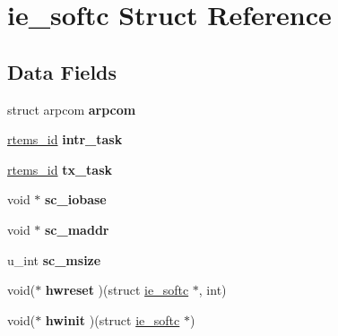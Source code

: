 \hypertarget{structie__softc}{}\section{ie\+\_\+softc Struct Reference}
\label{structie__softc}
\subsection*{Data Fields}
\begin{DoxyCompactItemize}
\item 
\mbox{\label{structie__softc_a9fa4f9da0ae481007ad149310d75d457}} 
struct arpcom {\bfseries arpcom}
\item 
\mbox{\label{structie__softc_abf9fa41076974007995b1df6c484bf7a}} 
\mbox{\hyperlink{group__ClassicTasks_gab20892b814dced7dd4e5b9bf42becd57}{rtems\+\_\+id}} {\bfseries intr\+\_\+task}
\item 
\mbox{\label{structie__softc_a31e8d68bd173487fd52d813c559c7b84}} 
\mbox{\hyperlink{group__ClassicTasks_gab20892b814dced7dd4e5b9bf42becd57}{rtems\+\_\+id}} {\bfseries tx\+\_\+task}
\item 
\mbox{\label{structie__softc_a86d2f47d937486cbb518c81bc0ea4aaf}} 
void $\ast$ {\bfseries sc\+\_\+iobase}
\item 
\mbox{\label{structie__softc_abc04361565c3a4d17c5c41435a3bba78}} 
void $\ast$ {\bfseries sc\+\_\+maddr}
\item 
\mbox{\label{structie__softc_a41bbeb8aa590ea8b14ba3f8552713ed7}} 
u\+\_\+int {\bfseries sc\+\_\+msize}
\item 
\mbox{\label{structie__softc_af156506c691dd4d49139d36b77e54f6a}} 
void($\ast$ {\bfseries hwreset} )(struct \mbox{\hyperlink{structie__softc}{ie\+\_\+softc}} $\ast$, int)
\item 
\mbox{\label{structie__softc_a81615ec33b44f5dcd89bfefe50d8c87c}} 
void($\ast$ {\bfseries hwinit} )(struct \mbox{\hyperlink{structie__softc}{ie\+\_\+softc}} $\ast$)
\item 
\mbox{\label{structie__softc_a3b0941734fce7cf458c7ee0d02d8c711}} 

\end{DoxyCompactItemize}
